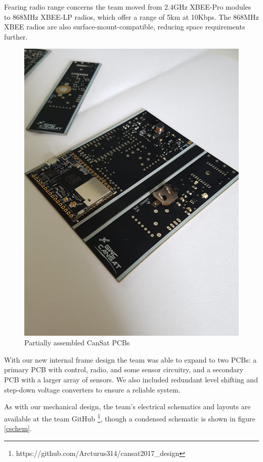 \documentclass[]{report}
\begin{document}
Fearing radio range concerns the team moved from 2.4GHz XBEE-Pro modules to 868MHz XBEE-LP radios, which offer a range of 5km at 10Kbps. The 868MHz XBEE radios are also surface-mount-compatible, reducing space requirements further.

\begin{figure}[h]
	\hfill\includegraphics[scale=0.05, angle=270]{pcbs.jpg}\hspace*{\fill}
	\caption{Partially assembled CanSat PCBs}
	\label{pboardnew}
\end{figure}

With our new internal frame design the team was able to expand to two PCBs: a primary PCB with control, radio, and some sensor circuitry, and a secondary PCB with a larger array of sensors. We also included redundant level shifting and step-down voltage converters to ensure a reliable system.

As with our mechanical design, the team's electrical schematics and layouts are available at the team GitHub \footnote{https://github.com/Arcturus314/cansat2017\_design}, though a condensed schematic is shown in figure \ref{cschem}.
\end{document}
